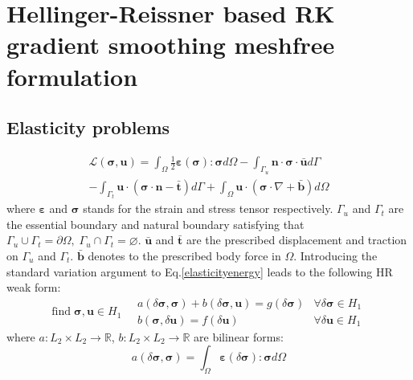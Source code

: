 \documentclass{article}
\begin{document}
\section{Hellinger-Reissner based RK gradient smoothing meshfree formulation}
\subsection{Elasticity problems}
\begin{multline}\label{elasticityenergy}
    \mathcal L(\boldsymbol \sigma, \boldsymbol u) = \int_{\Omega} \frac{1}{2} \boldsymbol \varepsilon(\boldsymbol \sigma) : \boldsymbol \sigma d\Omega - \int_{\Gamma_u} \boldsymbol n \cdot \boldsymbol \sigma \cdot \bar{\boldsymbol u} d\Gamma \\
    - \int_{\Gamma_t} \boldsymbol u \cdot (\boldsymbol \sigma \cdot \boldsymbol n - \bar{\boldsymbol t}) d\Gamma + \int_{\Omega} \boldsymbol u \cdot (\boldsymbol \sigma \cdot \nabla + \bar{\boldsymbol b}) d\Omega
\end{multline}
where $\boldsymbol \varepsilon$ and $\boldsymbol \sigma$ stands for the strain and stress tensor respectively. $\Gamma_u$ and $\Gamma_t$ are the essential boundary and natural boundary satisfying that $\Gamma_u \cup \Gamma_t = \partial \Omega,\; \Gamma_u \cap \Gamma_t = \varnothing$. $\bar{\boldsymbol u}$ and $\bar{\boldsymbol t}$ are the prescribed displacement and traction on $\Gamma_u$ and $\Gamma_t$. $\bar{\boldsymbol b}$ denotes to the prescribed body force in $\Omega$. Introducing the standard variation argument to Eq.\ref{elasticityenergy} leads to the following HR weak form:
\begin{equation}
    \mathrm{find} \; \boldsymbol \sigma, \boldsymbol u \in H_1 \quad
    \begin{array}{rr}
    a(\delta \boldsymbol \sigma,\boldsymbol \sigma) + b(\delta \boldsymbol \sigma, \boldsymbol u) = g(\delta \boldsymbol \sigma) & \forall \delta \boldsymbol \sigma \in H_1 \\
    b(\boldsymbol \sigma, \delta \boldsymbol u) = f(\delta \boldsymbol u) & \forall \delta \boldsymbol u \in H_1
    \end{array}
\end{equation}
where $a:L_2\times L_2\rightarrow \mathbb R$, $b:L_2\times L_2 \rightarrow \mathbb R$ are bilinear forms: 
\begin{equation}
    a(\delta \boldsymbol \sigma,\boldsymbol \sigma) = \int_{\Omega} \boldsymbol \varepsilon(\delta \boldsymbol \sigma):\boldsymbol \sigma d\Omega
\end{equation}
\end{document}
